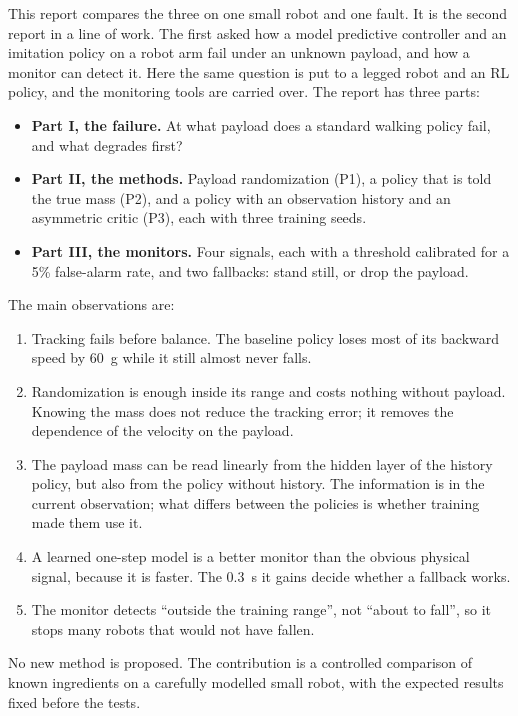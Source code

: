 \documentclass[conference]{IEEEtran}
\begin{document}
This report compares the three on one small robot and one fault.
It is the second report in a line of work.
The first \cite{li2026arm} asked how a model predictive controller and an imitation policy on a robot arm fail under an unknown payload, and how a monitor can detect it.
Here the same question is put to a legged robot and an RL policy, and the monitoring tools are carried over.
The report has three parts:
\begin{itemize}
\item \textbf{Part I, the failure.} At what payload does a standard walking policy fail, and what degrades first?
\item \textbf{Part II, the methods.} Payload randomization (P1), a policy that is told the true mass (P2), and a policy with an observation history and an asymmetric critic (P3), each with three training seeds.
\item \textbf{Part III, the monitors.} Four signals, each with a threshold calibrated for a 5\% false-alarm rate, and two fallbacks: stand still, or drop the payload.
\end{itemize}

The main observations are:
\begin{enumerate}
\item Tracking fails before balance. The baseline policy loses most of its backward speed by \SI{60}{g} while it still almost never falls.
\item Randomization is enough inside its range and costs nothing without payload. Knowing the mass does not reduce the tracking error; it removes the dependence of the velocity on the payload.
\item The payload mass can be read linearly from the hidden layer of the history policy, but also from the policy without history. The information is in the current observation; what differs between the policies is whether training made them use it.
\item A learned one-step model is a better monitor than the obvious physical signal, because it is faster. The \SI{0.3}{s} it gains decide whether a fallback works.
\item The monitor detects ``outside the training range'', not ``about to fall'', so it stops many robots that would not have fallen.
\end{enumerate}
No new method is proposed. The contribution is a controlled comparison of known ingredients on a carefully modelled small robot, with the expected results fixed before the tests.
\end{document}
